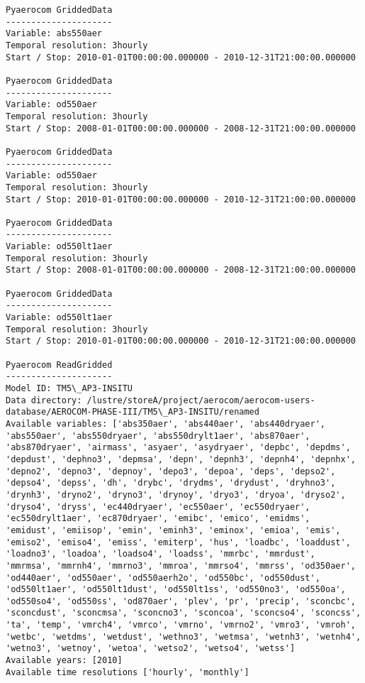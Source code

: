 \documentclass[11pt]{article}
\begin{document}
\begin{Verbatim}[commandchars=\\\{\}]
Pyaerocom GriddedData
---------------------
Variable: abs550aer
Temporal resolution: 3hourly
Start / Stop: 2010-01-01T00:00:00.000000 - 2010-12-31T21:00:00.000000

Pyaerocom GriddedData
---------------------
Variable: od550aer
Temporal resolution: 3hourly
Start / Stop: 2008-01-01T00:00:00.000000 - 2008-12-31T21:00:00.000000

Pyaerocom GriddedData
---------------------
Variable: od550aer
Temporal resolution: 3hourly
Start / Stop: 2010-01-01T00:00:00.000000 - 2010-12-31T21:00:00.000000

Pyaerocom GriddedData
---------------------
Variable: od550lt1aer
Temporal resolution: 3hourly
Start / Stop: 2008-01-01T00:00:00.000000 - 2008-12-31T21:00:00.000000

Pyaerocom GriddedData
---------------------
Variable: od550lt1aer
Temporal resolution: 3hourly
Start / Stop: 2010-01-01T00:00:00.000000 - 2010-12-31T21:00:00.000000

Pyaerocom ReadGridded
---------------------
Model ID: TM5\_AP3-INSITU
Data directory: /lustre/storeA/project/aerocom/aerocom-users-database/AEROCOM-PHASE-III/TM5\_AP3-INSITU/renamed
Available variables: ['abs350aer', 'abs440aer', 'abs440dryaer', 'abs550aer', 'abs550dryaer', 'abs550drylt1aer', 'abs870aer', 'abs870dryaer', 'airmass', 'asyaer', 'asydryaer', 'depbc', 'depdms', 'depdust', 'dephno3', 'depmsa', 'depn', 'depnh3', 'depnh4', 'depnhx', 'depno2', 'depno3', 'depnoy', 'depo3', 'depoa', 'deps', 'depso2', 'depso4', 'depss', 'dh', 'drybc', 'drydms', 'drydust', 'dryhno3', 'drynh3', 'dryno2', 'dryno3', 'drynoy', 'dryo3', 'dryoa', 'dryso2', 'dryso4', 'dryss', 'ec440dryaer', 'ec550aer', 'ec550dryaer', 'ec550drylt1aer', 'ec870dryaer', 'emibc', 'emico', 'emidms', 'emidust', 'emiisop', 'emin', 'eminh3', 'eminox', 'emioa', 'emis', 'emiso2', 'emiso4', 'emiss', 'emiterp', 'hus', 'loadbc', 'loaddust', 'loadno3', 'loadoa', 'loadso4', 'loadss', 'mmrbc', 'mmrdust', 'mmrmsa', 'mmrnh4', 'mmrno3', 'mmroa', 'mmrso4', 'mmrss', 'od350aer', 'od440aer', 'od550aer', 'od550aerh2o', 'od550bc', 'od550dust', 'od550lt1aer', 'od550lt1dust', 'od550lt1ss', 'od550no3', 'od550oa', 'od550so4', 'od550ss', 'od870aer', 'plev', 'pr', 'precip', 'sconcbc', 'sconcdust', 'sconcmsa', 'sconcno3', 'sconcoa', 'sconcso4', 'sconcss', 'ta', 'temp', 'vmrch4', 'vmrco', 'vmrno', 'vmrno2', 'vmro3', 'vmroh', 'wetbc', 'wetdms', 'wetdust', 'wethno3', 'wetmsa', 'wetnh3', 'wetnh4', 'wetno3', 'wetnoy', 'wetoa', 'wetso2', 'wetso4', 'wetss']
Available years: [2010]
Available time resolutions ['hourly', 'monthly']


\end{Verbatim}
\end{document}

